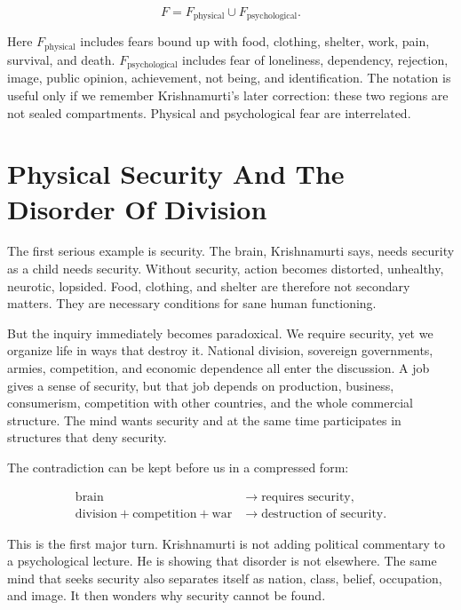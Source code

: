 \begin{equation}
F = F_{\mathrm{physical}} \cup F_{\mathrm{psychological}}.
\end{equation}

Here \(F_{\mathrm{physical}}\) includes fears bound up with food, clothing, shelter, work, pain, survival, and death. \(F_{\mathrm{psychological}}\) includes fear of loneliness, dependency, rejection, image, public opinion, achievement, not being, and identification. The notation is useful only if we remember Krishnamurti's later correction: these two regions are not sealed compartments. Physical and psychological fear are interrelated.

\section{Physical Security And The Disorder Of Division}

The first serious example is security. The brain, Krishnamurti says, needs security as a child needs security. Without security, action becomes distorted, unhealthy, neurotic, lopsided. Food, clothing, and shelter are therefore not secondary matters. They are necessary conditions for sane human functioning.

But the inquiry immediately becomes paradoxical. We require security, yet we organize life in ways that destroy it. National division, sovereign governments, armies, competition, and economic dependence all enter the discussion. A job gives a sense of security, but that job depends on production, business, consumerism, competition with other countries, and the whole commercial structure. The mind wants security and at the same time participates in structures that deny security.

The contradiction can be kept before us in a compressed form:

\begin{align}
\text{brain} &\longrightarrow \text{requires security}, \\
\text{division}+\text{competition}+\text{war} &\longrightarrow \text{destruction of security}.
\end{align}

This is the first major turn. Krishnamurti is not adding political commentary to a psychological lecture. He is showing that disorder is not elsewhere. The same mind that seeks security also separates itself as nation, class, belief, occupation, and image. It then wonders why security cannot be found.

